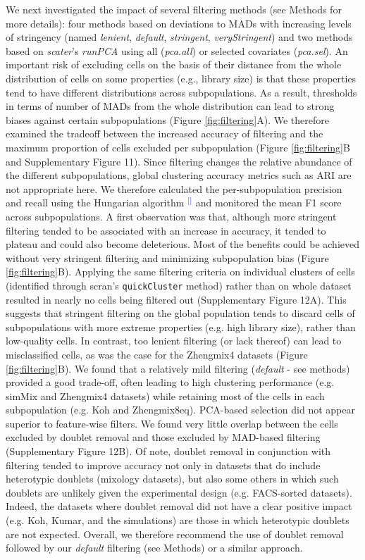 \documentclass[11pt]{article}
\renewcommand{\cite}[1]{\textcolor{Blue}{$^[$\supercite{#1}$^]$}}
\begin{document}
{\color{red}We next investigated the impact of several filtering methods (see Methods for more details): four methods based on deviations to MADs with increasing levels of stringency (named \textit{lenient}, \textit{default}, \textit{stringent}, \textit{veryStringent}) and two methods based on \textit{scater}'s \textit{runPCA} using all (\textit{pca.all}) or selected covariates (\textit{pca.sel})}. An important risk of excluding cells on the basis of their distance from the whole distribution of cells on some properties (e.g., library size) is that these properties tend to have different distributions across subpopulations. As a result, thresholds in terms of number of MADs from the whole distribution can lead to strong biases against certain subpopulations (Figure \ref{fig:filtering}A). We therefore examined the tradeoff between the increased accuracy of filtering and the maximum proportion of cells excluded per subpopulation (Figure \ref{fig:filtering}B and Supplementary Figure 11). Since filtering changes the relative abundance of the different subpopulations, global clustering accuracy metrics such as ARI are not appropriate here. We therefore calculated the per-subpopulation precision and recall using the Hungarian algorithm \cite{kuhnHungarianMethod1955} and monitored the mean F1 score {\color{red}across subpopulations. A first observation was that, although more stringent filtering tended to be associated with an increase in accuracy, it tended to plateau and could also become deleterious. Most of the benefits could be achieved without very stringent filtering and minimizing subpopulation bias (Figure \ref{fig:filtering}B). Applying the same filtering criteria on individual clusters of cells (identified through scran's \texttt{quickCluster} method) rather than on whole dataset resulted in nearly no cells being filtered out (Supplementary Figure 12A). This suggests that stringent filtering on the global population tends to discard cells of subpopulations with more extreme properties (e.g. high library size), rather than low-quality cells. In contrast, too lenient filtering (or lack thereof) can lead to misclassified cells, as was the case for the Zhengmix4 datasets (Figure \ref{fig:filtering}B). We found that a relatively mild filtering (\textit{default} - see methods) provided a good trade-off, often leading to high clustering performance (e.g. simMix and Zhengmix4 datasets) while retaining most of the cells in each subpopulation (e.g. Koh and Zhengmix8eq). PCA-based selection did not appear superior to feature-wise filters. We found very little overlap between the cells excluded by doublet removal and those excluded by MAD-based filtering (Supplementary Figure 12B). Of note, doublet removal in conjunction with filtering tended to improve accuracy not only in datasets that do include heterotypic doublets (mixology datasets), but also some others in which such doublets are unlikely given the experimental design (e.g. FACS-sorted datasets). Indeed, the datasets where doublet removal did not have a clear positive impact (e.g. Koh, Kumar, and the simulations) are those in which heterotypic doublets are not expected. Overall, we therefore recommend the use of doublet removal followed by our \textit{default} filtering (see Methods) or a similar approach.}
\end{document}
